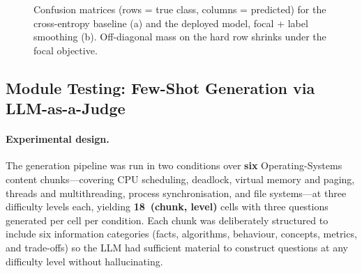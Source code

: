 \documentclass[12pt,a4paper]{report}
\begin{document}
\begin{figure}[ht]
\centering
\hspace{6mm}
\caption{Confusion matrices (rows = true class, columns = predicted) for the
cross-entropy baseline (a) and the deployed model, focal + label smoothing (b). Off-diagonal mass on
the hard row shrinks under the focal objective.}
\label{fig:cm}
\end{figure}

\subsection{Module Testing: Few-Shot Generation via LLM-as-a-Judge}

\paragraph{Experimental design.}
The generation pipeline was run in two conditions over \textbf{six} Operating-Systems
content chunks---covering CPU scheduling, deadlock, virtual memory and paging,
threads and multithreading, process synchronisation, and file systems---at three
difficulty levels each, yielding \textbf{18~(chunk, level)} cells with three
questions generated per cell per condition. Each chunk was deliberately structured
to include six information categories (facts, algorithms, behaviour, concepts,
metrics, and trade-offs) so the LLM had sufficient material to construct questions
at any difficulty level without hallucinating.
\end{document}

